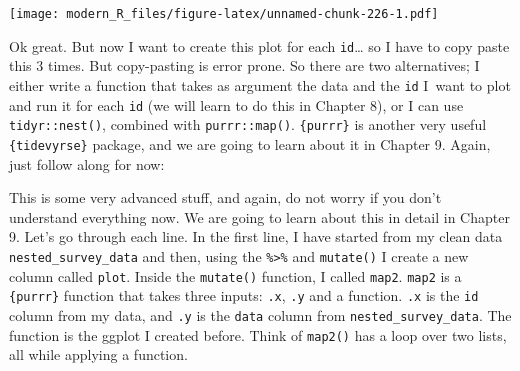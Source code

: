 \documentclass[]{gitbook}
\newenvironment{Shaded}{\begin{snugshade}}{\end{snugshade}}
\newcommand{\DataTypeTok}[1]{\textcolor[rgb]{0.13,0.29,0.53}{#1}}
\newcommand{\KeywordTok}[1]{\textcolor[rgb]{0.13,0.29,0.53}{\textbf{#1}}}
\newcommand{\NormalTok}[1]{#1}
\newcommand{\OperatorTok}[1]{\textcolor[rgb]{0.81,0.36,0.00}{\textbf{#1}}}
\newcommand{\StringTok}[1]{\textcolor[rgb]{0.31,0.60,0.02}{#1}}
\theoremstyle{definition}
\theoremstyle{definition}
\theoremstyle{definition}
\theoremstyle{remark}
\begin{document}
\texttt{[image: modern\_R\_files/figure-latex/unnamed-chunk-226-1.pdf]}

Ok great. But now I want to create this plot for each
\texttt{id}\ldots{} so I have to copy paste this 3 times. But
copy-pasting is error prone. So there are two alternatives; I either
write a function that takes as argument the data and the \texttt{id}
I~want to plot and run it for each \texttt{id} (we will learn to do this
in Chapter 8), or I can use \texttt{tidyr::nest()}, combined with
\texttt{purrr::map()}. \texttt{\{purrr\}} is another very useful
\texttt{\{tidevyrse\}} package, and we are going to learn about it in
Chapter 9. Again, just follow along for now:

\begin{Shaded}
\end{Shaded}

This is some very advanced stuff, and again, do not worry if you don't
understand everything now. We are going to learn about this in detail in
Chapter 9. Let's go through each line. In the first line, I have started
from my clean data \texttt{nested\_survey\_data} and then, using the
\texttt{\%\textgreater{}\%} and \texttt{mutate()} I create a new column
called \texttt{plot}. Inside the \texttt{mutate()} function, I called
\texttt{map2}. \texttt{map2} is a \texttt{\{purrr\}} function that takes
three inputs: \texttt{.x}, \texttt{.y} and a function. \texttt{.x} is
the \texttt{id} column from my data, and \texttt{.y} is the
\texttt{data} column from \texttt{nested\_survey\_data}. The function is
the ggplot I created before. Think of \texttt{map2()} has a loop over
two lists, all while applying a function.
\end{document}
